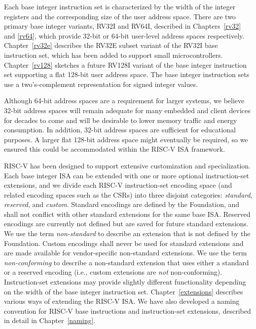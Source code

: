 Each base integer instruction set is characterized by the width of the
integer registers and the corresponding size of the user address
space.  There are two primary base integer variants, RV32I and RV64I,
described in Chapters~\ref{rv32} and \ref{rv64}, which provide 32-bit
or 64-bit user-level address spaces respectively.  Chapter~\ref{rv32e}
describes the RV32E subset variant of the RV32I base instruction set,
which has been added to support small microcontrollers.
Chapter~\ref{rv128} sketches a future RV128I variant of the base
integer instruction set supporting a flat 128-bit user address space.
The base integer instruction sets use a two's-complement
representation for signed integer values.

\begin{commentary}
Although 64-bit address spaces are a requirement for larger systems,
we believe 32-bit address spaces will remain adequate for many
embedded and client devices for decades to come and will be desirable
to lower memory traffic and energy consumption.  In addition, 32-bit
address spaces are sufficient for educational purposes.  A larger flat
128-bit address space might eventually be required, so we ensured this
could be accommodated within the RISC-V ISA framework.
\end{commentary}

RISC-V has been designed to support extensive customization and
specialization.  Each base integer ISA can be extended with one or
more optional instruction-set extensions, and we divide each RISC-V
instruction-set encoding space (and related encoding spaces such as
the CSRs) into three disjoint categories: {\em standard}, {\em
  reserved}, and {\em custom}.  Standard encodings are defined by the
Foundation, and shall not conflict with other standard extensions for
the same base ISA.  Reserved encodings are currently not defined but
are saved for future standard extensions.  We use the term {\em
  non-standard} to describe an extension that is not defined by the
Foundation.  Custom encodings shall never be used for standard
extensions and are made available for vendor-specific non-standard
extensions.  We use the term {\em non-conforming} to describe a
non-standard extension that uses either a standard or a reserved
encoding (i.e., custom extensions are {\em not} non-conforming).
Instruction-set extensions may provide slightly different
functionality depending on the width of the base integer instruction
set.  Chapter~\ref{extensions} describes various ways of extending the
RISC-V ISA.  We have also developed a naming convention for RISC-V
base instructions and instruction-set extensions, described in detail
in Chapter~\ref{naming}.


